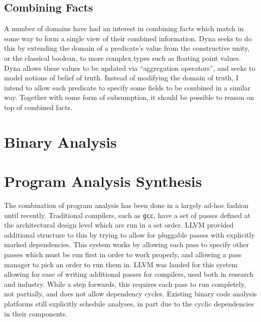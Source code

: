 \subsection{Combining Facts}
A number of domains have had an interest in combining facts which match in some way to form a single view of their combined information.
Dyna\cite{dyna} seeks to do this by extending the domain of a predicate's value from the constructive unity, or the classical boolean, to more complex types such as floating point values.
Dyna allows these values to be updated via ``aggregation operators'', and seeks to model notions of belief of truth.
Instead of modifying the domain of truth, I intend to allow each predicate to specify some fields to be combined in a similar way.
Together with some form of subsumption, it should be possible to reason on top of combined facts.
\section{Binary Analysis}
\section{Program Analysis Synthesis}
The combination of program analysis has been done in a largely ad-hoc fashion until recently.
Traditional compilers, such as \texttt{gcc}, have a set of passes defined at the architectural design level which are run in a set order.
LLVM\cite{llvm} provided additional structure to this by trying to allow for pluggable passes with explicitly marked dependencies.
This system works by allowing each pass to specify other passes which must be run first in order to work properly, and allowing a pass manager to pick an order to run them in.
LLVM was lauded for this system allowing for ease of writing additional passes for compilers, used both in research and industry.
While a step forwards, this requires each pass to run completely, not partially, and does not allow dependency cycles.
Existing binary code analysis platforms\cite{jakstab,bap,codesurfer,bitblaze,boomerang,bindead,ida} still explicitly schedule analyses, in part due to the cyclic dependencies in their components.
